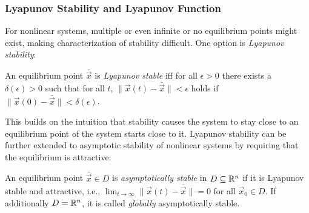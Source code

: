 			\subsubsection{Lyapunov Stability and Lyapunov Function}
				For nonlinear systems, multiple or even infinite or no equilibrium points might exist, making characterization of stability difficult. One option is \emph{Lyapunov stability}:
				\begin{definition}
					An equilibrium point \(\bar{\vec{x}}\) is \emph{Lyapunov stable} iff for all \(\epsilon > 0\) there exists a \(\delta(\epsilon) > 0\) such that for all \(t\), \( \lVert \vec{x}(t) - \bar{\vec{x}} \rVert < \epsilon \) holds if \( \lVert \vec{x}(0) - \bar{\vec{x}} \rVert < \delta(\epsilon) \).
				\end{definition}

				This builds on the intuition that stability causes the system to stay close to an equilibrium point of the system starts close to it. Lyapunov stability can be further extended to asymptotic stability of nonlinear systems by requiring that the equilibrium is attractive:
				\begin{definition}
					An equilibrium point \(\bar{\vec{x}} \in D\) is \emph{asymptotically stable} in \( D \subseteq \mathbb{R}^n \) if it is Lyapunov stable and attractive, i.e., \( \lim_{t \to \infty} \lVert \vec{x}(t) - \bar{\vec{x}} \rVert = 0 \) for all \( \vec{x}_0 \in D \). If additionally \( D = \mathbb{R}^n \), it is called \emph{globally} asymptotically stable.
				\end{definition}


